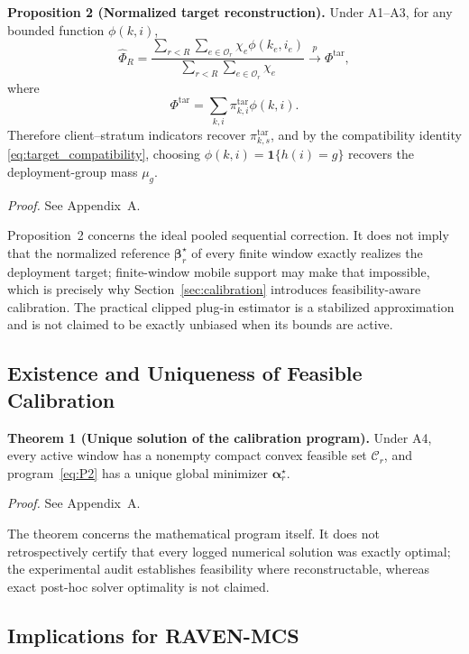 \documentclass[letterpaper,journal]{IEEEtran}
\begin{document}
\noindent\textbf{Proposition 2 (Normalized target reconstruction).}
Under A1--A3, for any bounded function $\phi(k,i)$,
\begin{equation}
 \widehat\Phi_R
 =
 \frac{
 \sum_{r<R}
 \sum_{e\in\mathcal{O}_r}
 \chi_e\phi(k_e,i_e)
 }{
 \sum_{r<R}
 \sum_{e\in\mathcal{O}_r}
 \chi_e
 }
 \xrightarrow{p}
 \Phi^{\mathrm{tar}},
 \label{eq:hajek_phi}
\end{equation}
where
\begin{equation}
 \Phi^{\mathrm{tar}}
 =
 \sum_{k,i}
 \pi^{\mathrm{tar}}_{k,i}\phi(k,i).
 \label{eq:target_phi}
\end{equation}
Therefore client--stratum indicators recover
$\pi^{\mathrm{tar}}_{k,s}$, and by the compatibility identity
\eqref{eq:target_compatibility}, choosing
$\phi(k,i)=\mathbf{1}\{h(i)=g\}$ recovers the deployment-group mass
$\mu_g$.

\noindent\emph{Proof.}
See Appendix~A.

Proposition~2 concerns the ideal pooled sequential correction.  It does not
imply that the normalized reference $\boldsymbol\beta_r^\star$ of every finite
window exactly realizes the deployment target; finite-window mobile support may
make that impossible, which is precisely why Section~\ref{sec:calibration}
introduces feasibility-aware calibration.  The practical clipped plug-in
estimator is a stabilized approximation and is not claimed to be exactly
unbiased when its bounds are active.

\subsection{Existence and Uniqueness of Feasible Calibration}
\label{subsec:theorem_calibration}

\noindent\textbf{Theorem 1 (Unique solution of the calibration program).}
Under A4, every active window has a nonempty compact convex feasible set
$\mathcal{C}_r$, and program~\eqref{eq:P2} has a unique global minimizer
$\boldsymbol\alpha_r^\star$.

\noindent\emph{Proof.}
See Appendix~A.

The theorem concerns the mathematical program itself.  It does not
retrospectively certify that every logged numerical solution was exactly
optimal; the experimental audit establishes feasibility where reconstructable,
whereas exact post-hoc solver optimality is not claimed.

\subsection{Implications for RAVEN-MCS}
\label{subsec:theory_implications}
\end{document}
